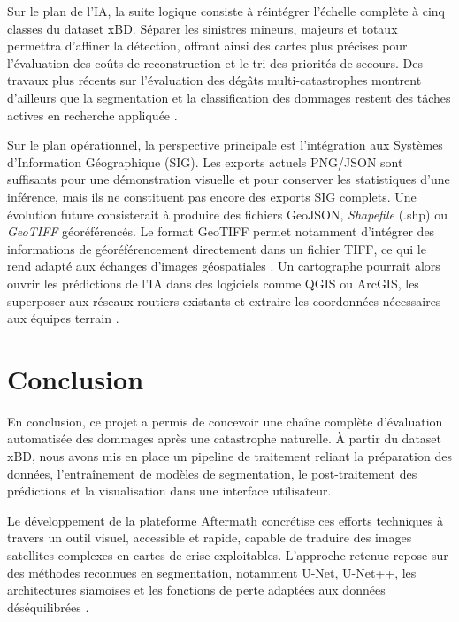 \documentclass[french,12pt]{article}
\begin{document}
Sur le plan de l'IA, la suite logique consiste à réintégrer l'échelle complète à cinq classes du dataset xBD. Séparer les sinistres mineurs, majeurs et totaux permettra d'affiner la détection, offrant ainsi des cartes plus précises pour l'évaluation des coûts de reconstruction et le tri des priorités de secours. Des travaux plus récents sur l'évaluation des dégâts multi-catastrophes montrent d'ailleurs que la segmentation et la classification des dommages restent des tâches actives en recherche appliquée \cite{deepdamagenet}.

Sur le plan opérationnel, la perspective principale est l'intégration aux Systèmes d'Information Géographique (SIG). Les exports actuels PNG/JSON sont suffisants pour une démonstration visuelle et pour conserver les statistiques d'une inférence, mais ils ne constituent pas encore des exports SIG complets. Une évolution future consisterait à produire des fichiers GeoJSON, \textit{Shapefile} (.shp) ou \textit{GeoTIFF} géoréférencés. Le format GeoTIFF permet notamment d'intégrer des informations de géoréférencement directement dans un fichier TIFF, ce qui le rend adapté aux échanges d'images géospatiales \cite{geotiff}. Un cartographe pourrait alors ouvrir les prédictions de l'IA dans des logiciels comme QGIS ou ArcGIS, les superposer aux réseaux routiers existants et extraire les coordonnées nécessaires aux équipes terrain \cite{qgis}.

\section{Conclusion}

En conclusion, ce projet a permis de concevoir une chaîne complète d'évaluation automatisée des dommages après une catastrophe naturelle. À partir du dataset xBD, nous avons mis en place un pipeline de traitement reliant la préparation des données, l'entraînement de modèles de segmentation, le post-traitement des prédictions et la visualisation dans une interface utilisateur.

Le développement de la plateforme Aftermath concrétise ces efforts techniques à travers un outil visuel, accessible et rapide, capable de traduire des images satellites complexes en cartes de crise exploitables. L'approche retenue repose sur des méthodes reconnues en segmentation, notamment U-Net, U-Net++, les architectures siamoises et les fonctions de perte adaptées aux données déséquilibrées \cite{unet,unetplusplus,siamunet_attn,dice_loss,tversky_loss}.
\end{document}
